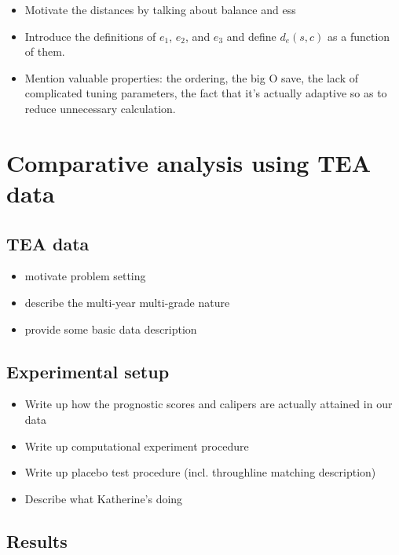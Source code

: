\documentclass[aoas]{imsart}
\theoremstyle{plain}
\theoremstyle{definition}
\begin{document}
\begin{itemize}
  \item Motivate the distances by talking about balance and ess
  \item Introduce the definitions of $e_1$, $e_2$, and $e_3$ and define $d_e(s, c)$ as a function of them.
  \item Mention valuable properties: the ordering, the big O save, the lack of complicated tuning parameters, the fact that it's actually adaptive so as to reduce unnecessary calculation.
\end{itemize}


\section{Comparative analysis using TEA data}

\subsection{TEA data}

\begin{itemize}
  \item motivate problem setting
  \item describe the multi-year multi-grade nature
  \item provide some basic data description
\end{itemize}

\subsection{Experimental setup}

\begin{itemize}
  \item Write up how the prognostic scores and calipers are actually attained in our data
  \item Write up computational experiment procedure
  \item Write up placebo test procedure (incl. throughline matching description)
  \item Describe what Katherine's doing
\end{itemize}

\subsection{Results}
\end{document}
